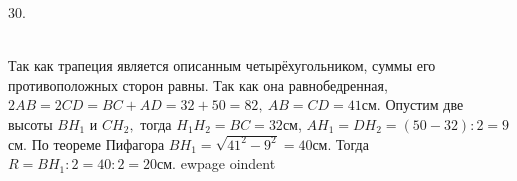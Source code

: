 30. \begin{figure}[ht!]
\end{figure}\\
Так как трапеция является описанным четырёхугольником, суммы его противоположных сторон равны. Так как она равнобедренная, $2AB=2CD=BC+AD=32+50=82,\ AB=CD=41$см. Опустим две высоты $BH_1$ и $CH_2,$ тогда $H_1H_2=BC=32$см, $AH_1=DH_2=(50-32):2=9$см. По теореме Пифагора $BH_1=\sqrt{41^2-9^2}=40$см. Тогда $R=BH_1:2=40:2=20$см.
ewpage
oindent
